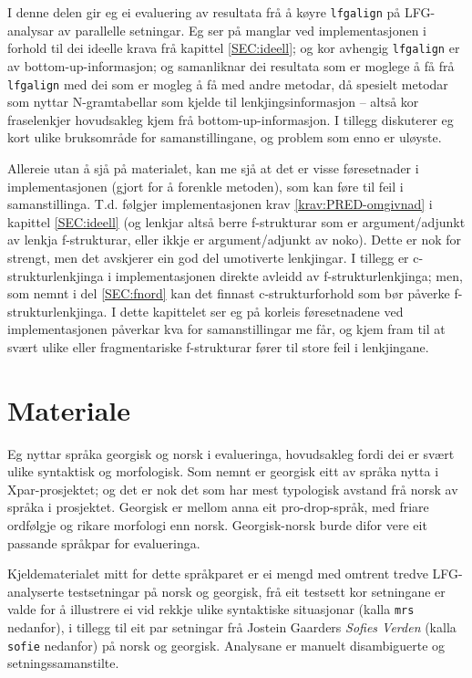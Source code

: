 \documentclass[11pt,a4paper,oneside,draft]{report}
\begin{document}
 I denne delen gir eg ei evaluering av resultata frå å køyre
 \texttt{lfgalign} på LFG-analysar av parallelle setningar. Eg ser på manglar
 ved implementasjonen i forhold til dei ideelle krava frå kapittel
 \ref{SEC:ideell}; og kor avhengig \texttt{lfgalign} er av
 bottom-up-informasjon; og samanliknar dei resultata som er moglege å
 få frå \texttt{lfgalign} med dei som er mogleg å få med andre metodar, då
 spesielt metodar som nyttar N-gramtabellar som kjelde til
 lenkjingsinformasjon -- altså kor fraselenkjer hovudsakleg kjem frå
 bottom-up-informasjon. I tillegg diskuterer eg kort ulike bruksområde
 for samanstillingane, og problem som enno er uløyste.

 Allereie utan å sjå på materialet, kan me sjå at det er visse
 føresetnader i implementasjonen (gjort for å forenkle metoden), som
 kan føre til feil i samanstillinga. T.d. følgjer implementasjonen
 krav \ref{krav:PRED-omgivnad} i kapittel \ref{SEC:ideell} (og lenkjar
 altså berre f-strukturar som er argument/adjunkt av lenkja
 f-strukturar, eller ikkje er argument/adjunkt av noko). Dette er nok
 for strengt, men det avskjerer ein god del umotiverte lenkjingar. I
 tillegg er c-strukturlenkjinga i implementasjonen direkte avleidd av
 f-strukturlenkjinga; men, som nemnt i del \ref{SEC:fnord} kan det
 finnast c-strukturforhold som bør påverke f-strukturlenkjinga. I
 dette kapittelet ser eg på korleis føresetnadene ved implementasjonen
 påverkar kva for samanstillingar me får, og kjem fram til at svært
 ulike eller fragmentariske f-strukturar fører til store feil i
 lenkjingane.
 
\section{Materiale}
\label{sec-5.1}

 Eg nyttar språka georgisk og norsk i evalueringa, hovudsakleg fordi
 dei er svært ulike syntaktisk og morfologisk. Som nemnt er georgisk
 eitt av språka nytta i Xpar-prosjektet; og det er nok det som har
 mest typologisk avstand frå norsk av språka i prosjektet.  Georgisk
 er mellom anna eit pro-drop-språk, med friare ordfølgje og rikare
 morfologi enn norsk. Georgisk-norsk burde difor vere eit passande
 språkpar for evalueringa.

 Kjeldematerialet mitt for dette språkparet er ei mengd med
 omtrent tredve LFG-analyserte testsetningar på norsk og georgisk, frå
 eit testsett kor setningane er valde for å illustrere ei vid rekkje
 ulike syntaktiske situasjonar (kalla \texttt{mrs} nedanfor), i tillegg til
 eit par setningar frå Jostein Gaarders \emph{Sofies Verden} (kalla \texttt{sofie}
 nedanfor) på norsk og georgisk. Analysane er manuelt disambiguerte og
 setningssamanstilte.
\end{document}

